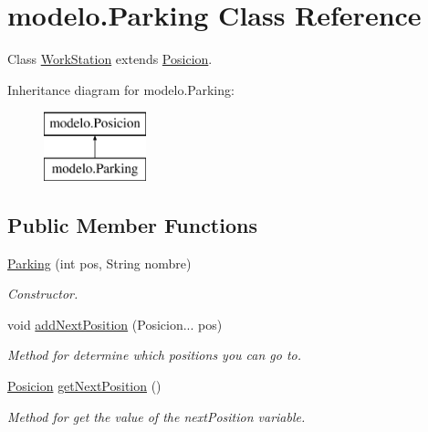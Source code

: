 \hypertarget{classmodelo_1_1_parking}{}\section{modelo.\+Parking Class Reference}
\label{classmodelo_1_1_parking}


Class \mbox{\hyperlink{classmodelo_1_1_work_station}{Work\+Station}} extends \mbox{\hyperlink{classmodelo_1_1_posicion}{Posicion}}.  


Inheritance diagram for modelo.\+Parking\+:\begin{figure}[H]
\begin{center}
\leavevmode
\includegraphics[height=2.000000cm]{classmodelo_1_1_parking}
\end{center}
\end{figure}
\subsection*{Public Member Functions}
\begin{DoxyCompactItemize}
\item 
\mbox{\hyperlink{classmodelo_1_1_parking_a23a70e07f89a4a9f3fab811546775ced}{Parking}} (int pos, String nombre)
\begin{DoxyCompactList}\small\item\em Constructor. \end{DoxyCompactList}\item 
void \mbox{\hyperlink{classmodelo_1_1_parking_ab2b526a6e9e8526767a0173cc3e4d406}{add\+Next\+Position}} (Posicion... pos)
\begin{DoxyCompactList}\small\item\em Method for determine which positions you can go to. \end{DoxyCompactList}\item 
\mbox{\hyperlink{classmodelo_1_1_posicion}{Posicion}} \mbox{\hyperlink{classmodelo_1_1_parking_a362f2bda656e3c9157c0589ae458c14a}{get\+Next\+Position}} ()
\begin{DoxyCompactList}\small\item\em Method for get the value of the next\+Position variable. \end{DoxyCompactList}\end{DoxyCompactItemize}


